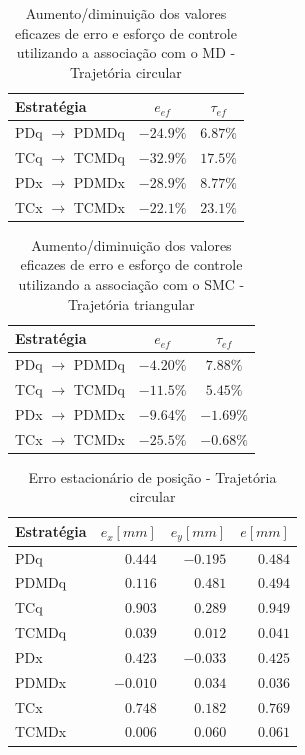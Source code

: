 \documentclass[]{politex}
\begin{document}
\begin{table}[H] 
\centering
\caption{Aumento/diminuição dos valores eficazes de erro e esforço de controle utilizando a associação com o MD - Trajetória circular}
\label{tab:valoresEficazesCompCirculo}
\begin{tabular}{l|c|c}
Estratégia              & $e_{ef}$  & $\tau_{ef} $ \\ \hline
PDq $\rightarrow$ PDMDq & $-24.9\%$ & $6.87\%$               \\
TCq $\rightarrow$ TCMDq & $-32.9\%$ & $17.5\%$               \\
PDx $\rightarrow$ PDMDx & $-28.9\%$ & $8.77\%$               \\
TCx $\rightarrow$ TCMDx & $-22.1\%$ & $23.1\%$               \\
\end{tabular}
\end{table}

\begin{table}[H] 
\centering
\caption{Aumento/diminuição dos valores eficazes de erro e esforço de controle utilizando a associação com o SMC - Trajetória triangular}
\label{tab:valoresEficazesCompTriangulo}
\begin{tabular}{l|c|c}
Estratégia              & $e_{ef}$          & $\tau_{ef} $ \\ \hline
PDq $\rightarrow$ PDMDq & $-4.20\%$         & $7.88\%$               \\
TCq $\rightarrow$ TCMDq & $-11.5\%$         & $5.45\%$               \\
PDx $\rightarrow$ PDMDx & $-9.64\%$         & $-1.69\%$               \\
TCx $\rightarrow$ TCMDx & $-25.5\%$         & $-0.68\%$               \\
\end{tabular}
\end{table}

\begin{table}[H] 
\centering
\caption{Erro estacionário de posição - Trajetória circular}
\label{tab:valorFinalCirculo}
\begin{tabular}{l|r|r|r}
Estratégia & $e_x [mm]$ & $e_y [mm]$ & $e [mm]$ \\ \hline
PDq        & $ 0.444$   & $-0.195$   & $0.484$  \\
PDMDq      & $ 0.116$   & $ 0.481$   & $0.494$  \\
TCq        & $ 0.903$   & $ 0.289$   & $0.949$  \\
TCMDq      & $ 0.039$   & $ 0.012$   & $0.041$  \\
PDx        & $ 0.423$   & $-0.033$   & $0.425$  \\
PDMDx      & $-0.010$   & $ 0.034$   & $0.036$  \\
TCx        & $ 0.748$   & $ 0.182$   & $0.769$  \\
TCMDx      & $ 0.006$   & $ 0.060$   & $0.061$  \\
\end{tabular}
\end{table}
\end{document}

